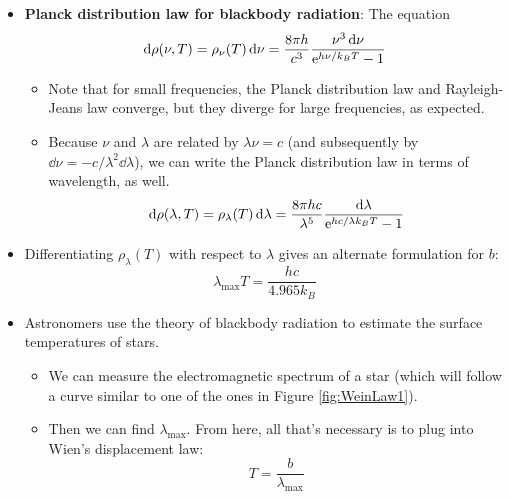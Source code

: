 \documentclass[../notes.tex]{subfiles}
\begin{document}
\begin{itemize}
    \item \textbf{Planck distribution law for blackbody radiation}: The equation
    \begin{equation*}
        \dd{\rho(\nu,T)} = \rho_\nu(T)\dd{\nu} = \frac{8\pi h}{c^3}\frac{\nu^3\dd{\nu}}{\e[h\nu/k_BT]-1}
    \end{equation*}
    \begin{itemize}
        \item Note that for small frequencies, the Planck distribution law and Rayleigh-Jeans law converge, but they diverge for large frequencies, as expected.
        \item Because $\nu$ and $\lambda$ are related by $\lambda\nu=c$ (and subsequently by $\dd{\nu}=-c/\lambda^2\dd{\lambda}$), we can write the Planck distribution law in terms of wavelength, as well.
        \begin{equation*}
            \dd{\rho(\lambda,T)} = \rho_\lambda(T)\dd{\lambda} = \frac{8\pi hc}{\lambda^5}\frac{\dd{\lambda}}{\e[hc/\lambda k_BT]-1}
        \end{equation*}
    \end{itemize}
    \item Differentiating $\rho_\lambda(T)$ with respect to $\lambda$ gives an alternate formulation for $b$:
    \begin{equation*}
        \lambda_\text{max}T = \frac{hc}{4.965k_B}
    \end{equation*}
    \item Astronomers use the theory of blackbody radiation to estimate the surface temperatures of stars.
    \begin{itemize}
        \item We can measure the electromagnetic spectrum of a star (which will follow a curve similar to one of the ones in Figure \ref{fig:WeinLaw1}).
        \item Then we can find $\lambda_\text{max}$. From here, all that's necessary is to plug into Wien's displacement law:
        \begin{equation*}
            T = \frac{b}{\lambda_\text{max}}
        \end{equation*}
    \end{itemize}
\end{itemize}
\end{document}
